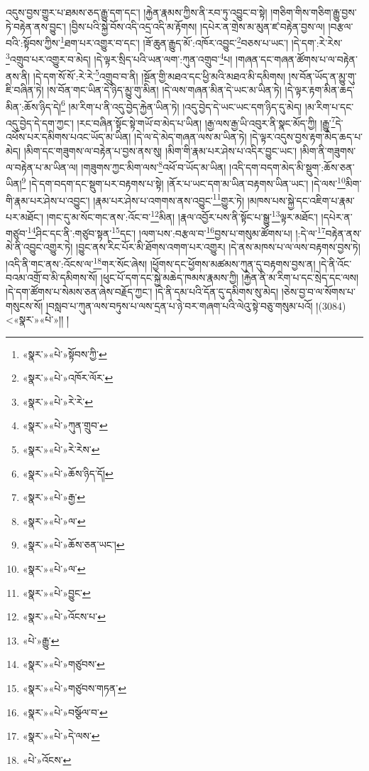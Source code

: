 འདུས་བྱས་གྱུར་པ་ཐམས་ཅད་རྒྱུ་དག་དང་། །རྐྱེན་རྣམས་ཀྱིས་ནི་རབ་ཏུ་འབྱུང་བ་སྟེ། །གཅིག་གིས་གཅིག་རྒྱུ་བྱས་ཏེ་བརྟེན་ནས་བྱུང་། །བྱིས་པའི་སྐྱེ་བོས་འདི་འདྲ་འདི་མ་རྟོགས། །དཔེར་ན་གྲེས་མ་མུན་ཛ་བརྟེན་བྱས་ལ། །བརྩལ་བའི་:སྟོབས་ཀྱིས་\footnote{«སྣར་»«པེ་»སྟོབས་ཀྱི་}ཐག་པར་འགྱུར་བ་དང་། །ཟོ་ཆུན་རྒྱུད་མོ་:འཁོར་འབྱུང་\footnote{«སྣར་»«པེ་»འཁོར་ལོར་}བཅས་པ་ཡང་། །དེ་དག་:རེ་རེས་\footnote{«སྣར་»«པེ་»རེ་རེ་}འགྲུབ་པར་འགྱུར་བ་མེད། །དེ་ལྟར་སྲིད་པའི་ཡན་ལག་:ཀུན་འགྲུབ་\footnote{«སྣར་»«པེ་»ཀུན་གྲུབ་}པ། །གཞན་དང་གཞན་ཚོགས་པ་ལ་བརྟེན་ནས་ནི། །དེ་དག་སོ་སོ་:རེ་རེ་\footnote{«སྣར་»«པེ་»རེ་རེས་}འགྲུབ་བ་ནི། །སྔོན་གྱི་མཐའ་དང་ཕྱི་མའི་མཐའ་མི་དམིགས། །ས་བོན་ཡོད་ན་མྱུ་གུ་ཇི་བཞིན་ཏེ། །ས་བོན་གང་ཡིན་དེ་ཉིད་མྱུ་གུ་མིན། །དེ་ལས་གཞན་མིན་དེ་ཡང་མ་ཡིན་ཏེ། །དེ་ལྟར་རྟག་མིན་ཆད་མིན་:ཆོས་ཉིད་དེ།\footnote{«སྣར་»«པེ་»ཆོས་ཉིད་དོ།} །མ་རིག་པ་ནི་འདུ་བྱེད་རྐྱེན་ཡིན་ཏེ། །འདུ་བྱེད་དེ་ཡང་ཡང་དག་ཉིད་དུ་མེད། །མ་རིག་པ་དང་འདུ་བྱེད་དེ་དག་ཀྱང་། །རང་བཞིན་སྟོང་སྟེ་གཡོ་བ་མེད་པ་ཡིན། །རྒྱ་ལས་རྒྱ་ཡི་འབུར་ནི་སྣང་མོད་ཀྱི། །རྒྱུ་\footnote{«སྣར་»«པེ་»རྒྱ་}དེ་འཕོས་པར་དམིགས་པའང་ཡོད་མ་ཡིན། །དེ་ལ་དེ་མེད་གཞན་ལས་མ་ཡིན་ཏེ། །དེ་ལྟར་འདུས་བྱས་རྟག་མེད་ཆད་པ་མེད། །མིག་དང་གཟུགས་ལ་བརྟེན་པ་བྱས་ནས་སུ། །མིག་གི་རྣམ་པར་ཤེས་པ་འདིར་བྱུང་ཡང་། །མིག་ནི་གཟུགས་ལ་བརྟེན་པ་མ་ཡིན་ལ། །གཟུགས་ཀྱང་མིག་ལས་\footnote{«སྣར་»«པེ་»ལ་}འཕོ་བ་ཡོད་མ་ཡིན། །འདི་དག་བདག་མེད་མི་སྡུག་:ཆོས་ཅན་ཡིན།\footnote{«སྣར་»«པེ་»ཆོས་ཅན་ཡང་།} །དེ་དག་བདག་དང་སྡུག་པར་བརྟགས་པ་སྟེ། །ནོར་པ་ཡང་དག་མ་ཡིན་བརྟགས་ཡིན་ཡང་། །དེ་ལས་\footnote{«སྣར་»«པེ་»ལ་}མིག་གི་རྣམ་པར་ཤེས་པ་འབྱུང་། །རྣམ་པར་ཤེས་པ་འགགས་ནས་འབྱུང་\footnote{«སྣར་»«པེ་»བྱུང་}གྱུར་ཏེ། །མཁས་པས་སྐྱེ་དང་འཇིག་པ་རྣམ་པར་མཐོང་། །གང་དུ་མ་སོང་གང་ནས་:འོང་བ་\footnote{«སྣར་»«པེ་»འོངས་པ་}མིན། །རྣལ་འབྱོར་པས་ནི་སྟོང་པ་སྒྱུ་\footnote{«པེ་»རྒྱུ་}ལྟར་མཐོང་། །དཔེར་ན་གཙུབ་\footnote{«སྣར་»«པེ་»གཙུབས་}ཤིང་དང་ནི་:གཙུབ་སྟན་\footnote{«སྣར་»«པེ་»གཙུབས་གཏན་}དང་། །ལག་པས་:བརྩལ་བ་\footnote{«སྣར་»«པེ་»བསྩོལ་བ་}བྱས་པ་གསུམ་ཚོགས་པ། །:དེ་ལ་\footnote{«སྣར་»«པེ་»དེ་ལས་}བརྟེན་ནས་མེ་ནི་འབྱུང་འགྱུར་ཏེ། །བྱུང་ནས་རིང་པོར་མི་ཐོགས་འགག་པར་འགྱུར། །དེ་ནས་མཁས་པ་ལ་ལས་བརྟགས་བྱས་ཏེ། །འདི་ནི་གང་ནས་:འོངས་ལ་\footnote{«པེ་»འོངས་}གར་སོང་ཞེས། །ཕྱོགས་དང་ཕྱོགས་མཚམས་ཀུན་དུ་བརྟགས་བྱས་ན། །དེ་ནི་འོང་བའམ་འགྲོ་བ་མི་དམིགས་སོ། །ཕུང་པོ་དག་དང་སྐྱེ་མཆེད་ཁམས་རྣམས་ཀྱི། །རྐྱེན་ནི་མ་རིག་པ་དང་སྲེད་དང་ལས། །དེ་དག་ཚོགས་པ་སེམས་ཅན་ཞེས་བརྗོད་ཀྱང་། །དེ་ནི་དམ་པའི་དོན་དུ་དམིགས་སུ་མེད། །ཅེས་བྱ་བ་ལ་སོགས་པ་གསུངས་སོ། །བསླབ་པ་ཀུན་ལས་བཏུས་པ་ལས་དྲན་པ་ཉེ་བར་གཞག་པའི་ལེའུ་སྟེ་བཅུ་གསུམ་པའོ། །(3084) <«སྣར་»«པེ་»།། །

